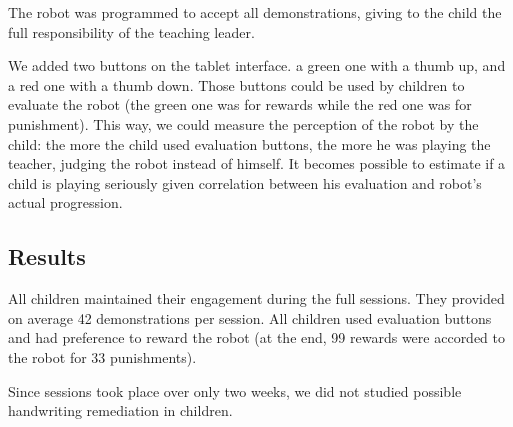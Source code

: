 \documentclass{sig-alternate}
\begin{document}
The robot was programmed to accept all demonstrations, giving to the child the
full responsibility of the teaching leader.

We added two buttons on the tablet  interface. a green one with a thumb up, and
a red one with a thumb down. Those buttons could be used by children to evaluate the
robot (the green one was for rewards while the red one was for punishment). This
way, we could measure the perception of the robot by the child: the more the
child used evaluation buttons, the more he was playing the teacher, judging the
robot instead of himself. It becomes possible to estimate if a child is playing
seriously given correlation between his evaluation and robot's actual
progression.


\subsection{Results}

All children maintained their engagement during the full sessions. They provided
on average 42 demonstrations per session. All children used evaluation buttons and
had preference to reward the robot (at the end, 99 rewards were accorded to the
robot for 33 punishments). 

Since sessions took place over only two weeks, we did not studied possible
handwriting remediation in children. 
\end{document}
